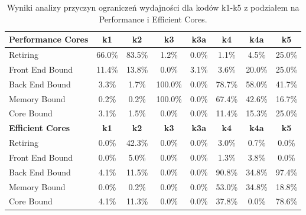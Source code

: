 \documentclass[10pt]{article}
\begin{document}
\begin{table}[h!]
\centering
\begingroup
\begin{tabular}{|l|c|c|c|c|c|c|c|}
\hline
\textbf{Performance Cores} & \textbf{k1} & \textbf{k2} & \textbf{k3} & \textbf{k3a} & \textbf{k4} & \textbf{k4a} & \textbf{k5} \\
\hline
Retiring & 66.0\% & 83.5\% & 1.2\% & 0.0\% & 1.1\% & 4.5\% & 25.0\% \\
\hline
Front End Bound & 11.4\% & 13.8\% & 0.0\% & 3.1\% & 3.6\% & 20.0\% & 25.0\% \\
\hline
Back End Bound & 3.3\% & 1.7\% & 100.0\% & 0.0\% & 78.7\% & 58.0\% & 41.7\% \\
\hline
Memory Bound & 0.2\% & 0.2\% & 100.0\% & 0.0\% & 67.4\% & 42.6\% & 16.7\% \\
\hline
Core Bound & 3.1\% & 1.5\% & 0.0\% & 0.0\% & 11.4\% & 15.3\% & 25.0\% \\
\hline
\textbf{Efficient Cores} & \textbf{k1} & \textbf{k2} & \textbf{k3} & \textbf{k3a} & \textbf{k4} & \textbf{k4a} & \textbf{k5} \\
\hline
Retiring & 0.0\% & 42.3\% & 0.0\% & 0.0\% & 3.0\% & 0.7\% & 0.0\% \\
\hline
Front End Bound & 0.0\% & 5.0\% & 0.0\% & 0.0\% & 1.3\% & 3.8\% & 0.0\% \\
\hline
Back End Bound & 4.1\% & 11.5\% & 0.0\% & 0.0\% & 90.8\% & 34.8\% & 97.4\% \\
\hline
Memory Bound & 0.0\% & 0.2\% & 0.0\% & 0.0\% & 53.0\% & 34.8\% & 18.8\% \\
\hline
Core Bound & 4.1\% & 11.3\% & 0.0\% & 0.0\% & 37.8\% & 0.0\% & 78.6\% \\
\hline
\end{tabular} 
\endgroup
\caption{Wyniki analizy przyczyn ograniczeń wydajności dla kodów k1-k5 z podziałem na Performance i Efficient Cores.}
\end{table}
\newpage
\end{document}
